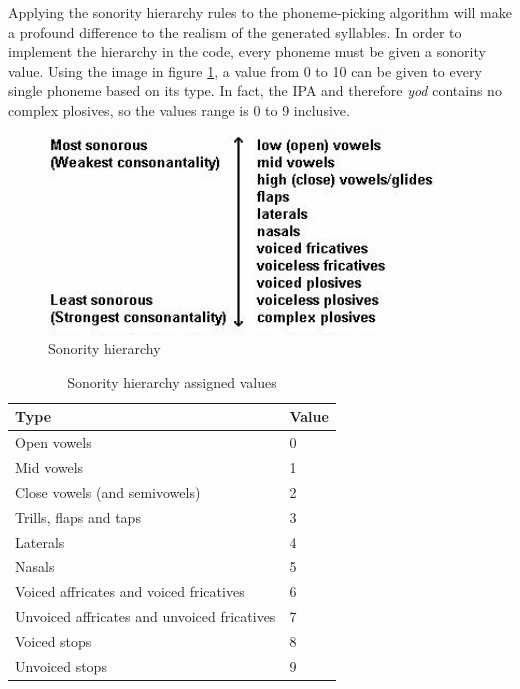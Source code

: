 \documentclass{report}
\begin{document}
	Applying the sonority hierarchy rules to the phoneme-picking algorithm will make a profound difference to the realism of the generated syllables. In order to implement the hierarchy in the code, every phoneme must be given a sonority value. Using the image in figure \ref{sonority hierarchy}, a value from 0 to 10 can be given to every single phoneme based on its type. In fact, the IPA and therefore \textit{yod} contains no complex plosives, so the values range is 0 to 9 inclusive.
	
	\begin{figure}
		\caption{Sonority hierarchy\cite{glossaryoflinguisticterms}}
		\label{sonority hierarchy}
		\includegraphics[height=150pt]{sonority}
	\end{figure}

	\begin{table}
		\centering
		\caption{Sonority hierarchy assigned values}
		\label{sonority hierarchy assigned values}
		\begin{tabular}{|l|l|}
			\hline
			\cellcolor[HTML]{D8D8D8}Type  & \cellcolor[HTML]{D8D8D8}Value \\
			\hline
			Open vowels                                 & 0     \\
			Mid vowels                                  & 1     \\
			Close vowels (and semivowels)               & 2     \\
			Trills, flaps and taps                      & 3     \\
			Laterals                                    & 4     \\
			Nasals                                      & 5     \\
			Voiced affricates and voiced fricatives     & 6     \\
			Unvoiced affricates and unvoiced fricatives & 7     \\
			Voiced stops                                & 8     \\
			Unvoiced stops                              & 9     \\ \hline
		\end{tabular}
	\end{table}
\end{document}
